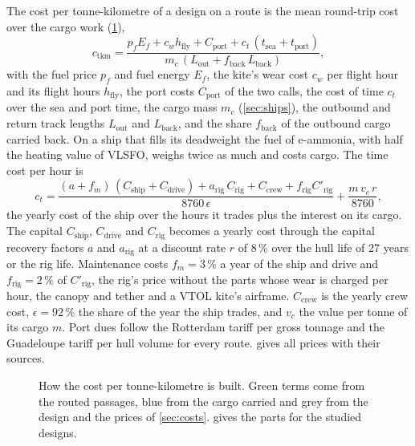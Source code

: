 The cost per tonne-kilometre of a design on a route is the mean round-trip cost over the cargo work (\cref{fig:cost_tree}),
\begin{equation}
c_\mathrm{tkm} = \frac{p_f E_f + c_w h_\mathrm{fly} + C_\mathrm{port} + c_t\,(t_\mathrm{sea}+t_\mathrm{port})}{m_c\,(L_\mathrm{out} + f_\mathrm{back}\,L_\mathrm{back})},
\end{equation}
with the fuel price $p_f$ and fuel energy $E_f$, the kite's wear cost $c_w$ per flight hour and its flight hours $h_\mathrm{fly}$, the port costs $C_\mathrm{port}$ of the two calls, the cost of time $c_t$ over the sea and port time, the cargo mass $m_c$ (\cref{sec:ships}), the outbound and return track lengths $L_\mathrm{out}$ and $L_\mathrm{back}$, and the share $f_\mathrm{back}$ of the outbound cargo carried back. On a ship that fills its deadweight the fuel of e-ammonia, with half the heating value of VLSFO, weighs twice as much and costs cargo. The time cost per hour is
\begin{equation}
c_t = \frac{(a + f_m)\,(C_\mathrm{ship}+C_\mathrm{drive}) + a_\mathrm{rig}\,C_\mathrm{rig} + C_\mathrm{crew} + f_\mathrm{rig} C'_\mathrm{rig}}{8760\,\epsilon} + \frac{m\,v_c\,r}{8760},
\end{equation}
the yearly cost of the ship over the hours it trades plus the interest on its cargo. The capital $C_\mathrm{ship}$, $C_\mathrm{drive}$ and $C_\mathrm{rig}$ becomes a yearly cost through the capital recovery factors $a$ and $a_\mathrm{rig}$ at a discount rate $r$ of 8\,\% over the hull life of 27 years or the rig life. Maintenance costs $f_m=3\,\%$ a year of the ship and drive and $f_\mathrm{rig}=2\,\%$ \citep{emsa2023,tillig2020b} of $C'_\mathrm{rig}$, the rig's price without the parts whose wear is charged per hour, the canopy and tether and a VTOL kite's airframe. $C_\mathrm{crew}$ is the yearly crew cost, $\epsilon=92\,\%$ the share of the year the ship trades, and $v_c$ the value per tonne of its cargo $m$. Port dues follow the Rotterdam tariff per gross tonnage and the Guadeloupe tariff per hull volume for every route.  gives all prices with their sources.

\begin{figure}[tbp]
\centering

\caption{How the cost per tonne-kilometre is built. Green terms come from the routed passages, blue from the cargo carried and grey from the design and the prices of \cref{sec:costs}.  gives the parts for the studied designs.}
\label{fig:cost_tree}
\end{figure}

